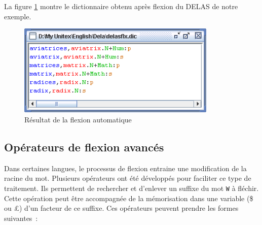 \bigskip
\noindent La figure \ref{fig-inflection-result} montre le dictionnaire obtenu après flexion du DELAS de notre exemple.

\bigskip
\begin{figure}[!ht]
\begin{center}
\includegraphics[width=9.5cm]{resources/img/fig3-9.png}
\caption{Résultat de la flexion automatique\label{fig-inflection-result}}
\end{center}
\end{figure}
\bigskip

\subsection{Opérateurs de flexion avancés}
\label{advanced-inflection-operators}
Dans certaines langues, le processus de flexion entraine une modification de la racine du mot.
Plusieurs opérateurs ont été développés pour faciliter ce type de traitement. Ils permettent de rechercher
et d'enlever un suffixe du mot \verb+W+ \`a fléchir. Cette opération peut
\^etre accompagnée de la mémorisation dans une variable (\$ ou \pounds) d'un facteur de ce suffixe.
Ces opérateurs peuvent prendre les formes suivantes~:

